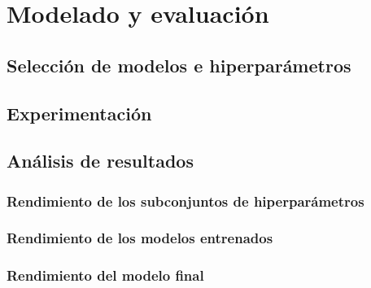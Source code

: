 \chapter{Modelado y evaluación}

\section{Selección de modelos e hiperparámetros}

\section{Experimentación}

\section{Análisis de resultados}

\subsection{Rendimiento de los subconjuntos de hiperparámetros}

\subsection{Rendimiento de los modelos entrenados}

\subsection{Rendimiento del modelo final}